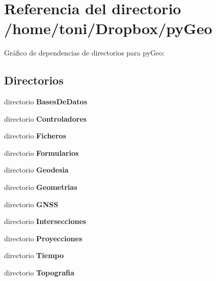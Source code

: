 \section{Referencia del directorio /home/toni/\-Dropbox/py\-Geo}
\label{dir_e2627865121f9a1fcbd3858eeb7187ed}
Gráfico de dependencias de directorios para py\-Geo\-:
\subsection*{Directorios}
\begin{DoxyCompactItemize}
\item 
directorio {\bf Bases\-De\-Datos}
\item 
directorio {\bf Controladores}
\item 
directorio {\bf Ficheros}
\item 
directorio {\bf Formularios}
\item 
directorio {\bf Geodesia}
\item 
directorio {\bf Geometrias}
\item 
directorio {\bf G\-N\-S\-S}
\item 
directorio {\bf Intersecciones}
\item 
directorio {\bf Proyecciones}
\item 
directorio {\bf Tiempo}
\item 
directorio {\bf Topografia}
\end{DoxyCompactItemize}
